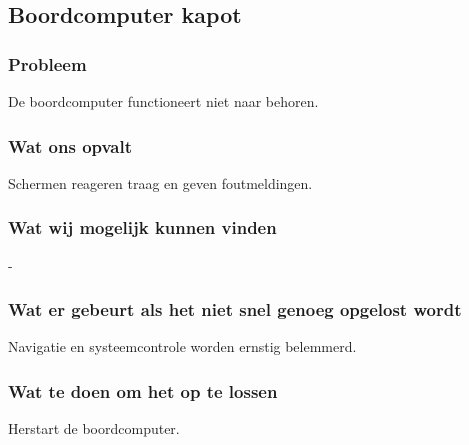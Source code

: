 \subsection{Boordcomputer kapot}

\subsubsection{Probleem}
De boordcomputer functioneert niet naar behoren.

\subsubsection{Wat ons opvalt}
Schermen reageren traag en geven foutmeldingen.

\subsubsection{Wat wij mogelijk kunnen vinden}
-

\subsubsection{Wat er gebeurt als het niet snel genoeg opgelost wordt}
Navigatie en systeemcontrole worden ernstig belemmerd.

\subsubsection{Wat te doen om het op te lossen}
Herstart de boordcomputer.